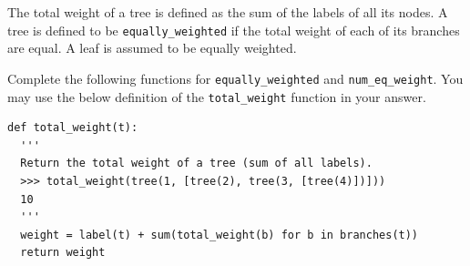 \question 
The total weight of a tree is defined as the sum of the labels of all its nodes. A tree is defined to be \lstinline{equally_weighted} if the total weight of each of its branches are equal. A leaf is assumed to be equally weighted.

Complete the following functions for \lstinline{equally_weighted} and \lstinline{num_eq_weight}. You may use the below definition of the \lstinline{total_weight} function in your answer.

\begin{lstlisting}
def total_weight(t):
  '''
  Return the total weight of a tree (sum of all labels).
  >>> total_weight(tree(1, [tree(2), tree(3, [tree(4)])]))
  10
  '''
  weight = label(t) + sum(total_weight(b) for b in branches(t))
  return weight
  
  
\end{lstlisting}
\vspace{1\baselineskip}
